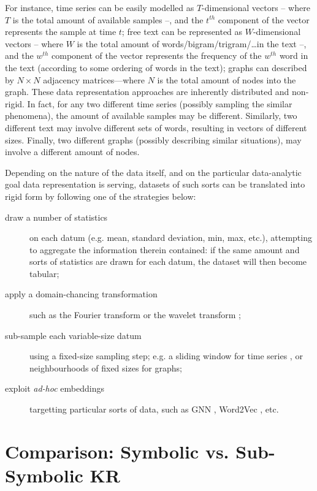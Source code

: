 \documentclass[12pt,a4paper,openright,twoside]{book}
\begin{document}
For instance, time series can be easily modelled as $T$-dimensional vectors -- where $T$ is the total amount of available samples --, and the $t^{th}$ component of the vector represents the sample at time $t$;
%
free text can be represented as $W$-dimensional vectors -- where $W$ is the total amount of words/bigram/trigram/\ldots in the text --, and
the $w^{th}$ component of the vector represents the frequency of the $w^{th}$ word in the text (according to some ordering of words in the text);
%
graphs can described by $N \times N$ adjacency matrices---where $N$ is the total amount of nodes into the graph.
%
These data representation approaches are inherently distributed and non-rigid.
%
In fact, for any two different time series (possibly sampling the similar phenomena), the amount of available samples may be different.
%
Similarly, two different text may involve different sets of words, resulting in vectors of different sizes.
%
Finally, two different graphs (possibly describing similar situations), may involve a different amount of nodes.

Depending on the nature of the data itself, and on the particular data-analytic goal data representation is serving, datasets of such sorts can be translated into rigid form by following one of the strategies below:
%
\begin{description}
    \item[draw a number of statistics] on each datum (e.g. mean, standard deviation, min, max, etc.), attempting to aggregate the information therein contained: if the same amount and sorts of statistics are drawn for each datum, the dataset will then become tabular;
    \item[apply a domain-chancing transformation] such as the Fourier transform \cite{CooleyLW1969} or the wavelet transform \cite{Zhang2019};
    \item[sub-sample each variable-size datum] using a fixed-size sampling step; e.g. a sliding window for time series \cite{FrankDH01}, or neighbourhoods of fixed sizes for graphs;
    \item[exploit \emph{ad-hoc} embeddings] targetting particular sorts of data, such as GNN \cite{WuPCLZY2021}, Word2Vec \cite{Church2017}, etc.
\end{description}

\section{Comparison: Symbolic vs. Sub-Symbolic KR}
\end{document}
